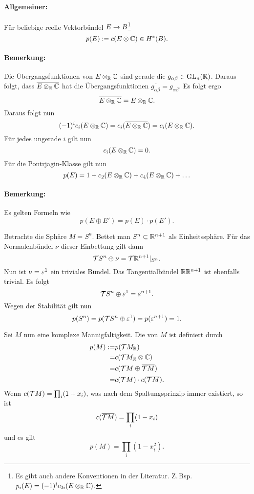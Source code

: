 \paragraph{Allgemeiner:}
Für beliebige reelle Vektorbündel $E \overset{}{\rightarrow} B$\footnote{Es gibt auch andere Konventionen in der Literatur. Z.\,Bsp. $p_i(E) = (-1)^i c_{2i} (E\otimes_{\mathbb{R}} \mathbb{C})$.}
\[ p(E) := c(E \otimes \mathbb{C}) \in H^*(B). \]
\paragraph{Bemerkung:} Die Übergangsfunktionen von $E\otimes_{\mathbb{R}} \mathbb{C}$ sind gerade die $g_{\alpha \beta} \in \mathrm{GL}_n(\mathbb{R})$. Daraus folgt, dass $\overline{E\otimes_{\mathbb{R}} \mathbb{C}}$ hat die Übergangsfunktionen $\overline{g_{\alpha \beta}} = g_{\alpha \beta}$. Es folgt ergo
\[ \overline{E \otimes_{\mathbb{R}} \mathbb{C}} = E \otimes_{\mathbb{R}} \mathbb{C}. \]
Daraus folgt nun
\[
(-1)^i c_i(E\otimes_{\mathbb{R}} \mathbb{C}) = c_i(\overline{E \otimes_{\mathbb{R}} \mathbb{C}}) = c_i({E \otimes_{\mathbb{R}} \mathbb{C}}).  \]
Für jedes ungerade $i$ gilt nun
\[ c_i(E\otimes_{\mathbb{R}} \mathbb{C}) = 0. \]
Für die Pontrjagin-Klasse gilt nun
\[ p(E) = 1 + c_2(E\otimes_{\mathbb{R}} \mathbb{C}) + c_4(E\otimes_{\mathbb{R}} \mathbb{C}) + \ldots \]

\paragraph{Bemerkung:}
Es gelten Formeln wie
\[ p(E\oplus E') = p(E) \cdot p(E'). \]

\Bsp{}
Betrachte die Sphäre $M = S^n$. Bettet man $S^n \subset \mathbb{R}^{n+1}$ als Einheitssphäre. Für das Normalenbündel $\nu$ dieser Einbettung gilt dann
\[ \mathcal{T} S^n \oplus \nu = \mathcal{T} \mathbb{R}^{n+1}|_{S^n}. \]
Nun ist $\nu = \varepsilon^1$ ein triviales Bündel. Das Tangentialbündel $\mathbb{R} \mathbb{R}^{n+1}$ ist ebenfalls trivial. Es folgt
\[ \mathcal{T} S^n \oplus \varepsilon^1 = \varepsilon^{n+1}. \]
Wegen der Stabilität gilt nun
\[ p(S^n) = p(\mathcal{T} S^n \oplus \varepsilon^1) = p(\varepsilon^{n+1}) = 1. \]

\Def{}
Sei $M$ nun eine komplexe Mannigfaltigkeit. Die  von $M$ ist definiert durch
\begin{align*}
p(M):=& p(\mathcal{T} M_{\mathbb{R}})\\
=& c(\mathcal{T} M_{\mathbb{R}} \otimes \mathbb{C}) \\
=& c(\mathcal{T} M \oplus \overline{\mathcal{T} M})\\
=& c(\mathcal{T} M ) \cdot c(\overline{\mathcal{T} M}).
\end{align*}
Wenn $c(\mathcal{T} M ) = \prod_i (1 + x_i)$, was nach dem Spaltungsprinzip immer existiert, so ist
\[ c(\overline{\mathcal{T} M}) = \prod_i (1 - x_i) \]
und es gilt
\[ p(M) = \prod_i (1- x_i^2). \]
